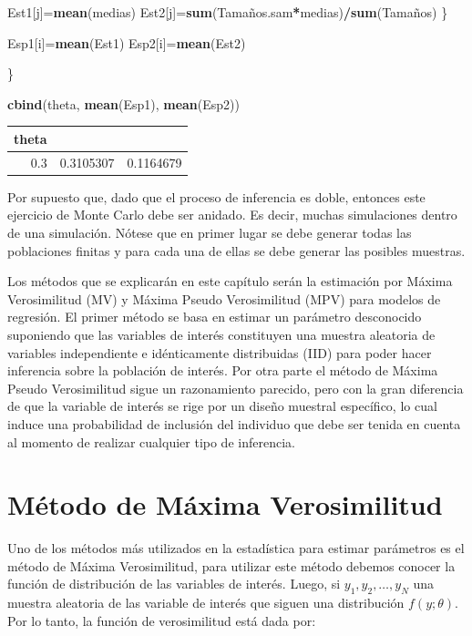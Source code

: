 \documentclass[
  spanish,
  12pt,
]{book}
\newenvironment{Shaded}{\begin{snugshade}}{\end{snugshade}}
\newcommand{\FunctionTok}[1]{\textcolor[rgb]{0.13,0.29,0.53}{\textbf{#1}}}
\newcommand{\NormalTok}[1]{#1}
\newcommand{\OtherTok}[1]{\textcolor[rgb]{0.56,0.35,0.01}{#1}}
\newcommand{\SpecialCharTok}[1]{\textcolor[rgb]{0.81,0.36,0.00}{\textbf{#1}}}
\begin{document}
\begin{Shaded}
\begin{Highlighting}[]
\NormalTok{Est1[j]}\OtherTok{=}\FunctionTok{mean}\NormalTok{(medias)}
\NormalTok{Est2[j]}\OtherTok{=}\FunctionTok{sum}\NormalTok{(Tamaños.sam}\SpecialCharTok{*}\NormalTok{medias)}\SpecialCharTok{/}\FunctionTok{sum}\NormalTok{(Tamaños)}
\NormalTok{\}}

\NormalTok{Esp1[i]}\OtherTok{=}\FunctionTok{mean}\NormalTok{(Est1)}
\NormalTok{Esp2[i]}\OtherTok{=}\FunctionTok{mean}\NormalTok{(Est2)}

\NormalTok{\}}

\FunctionTok{cbind}\NormalTok{(theta, }\FunctionTok{mean}\NormalTok{(Esp1), }\FunctionTok{mean}\NormalTok{(Esp2))}
\end{Highlighting}
\end{Shaded}

\begin{tabular}{r|r|r}
\hline
theta &  & \\
\hline
0.3 & 0.3105307 & 0.1164679\\
\hline
\end{tabular}

Por supuesto que, dado que el proceso de inferencia es doble, entonces este ejercicio de Monte Carlo debe ser anidado. Es decir, muchas simulaciones dentro de una simulación. Nótese que en primer lugar se debe generar todas las poblaciones finitas y para cada una de ellas se debe generar las posibles muestras.

Los métodos que se explicarán en este capítulo serán la estimación por Máxima Verosimilitud (MV) y Máxima Pseudo Verosimilitud (MPV) para modelos de regresión. El primer método se basa en estimar un parámetro desconocido suponiendo que las variables de interés constituyen una muestra aleatoria de variables independiente e idénticamente distribuidas (IID) para poder hacer inferencia sobre la población de interés. Por otra parte el método de Máxima Pseudo Verosimilitud sigue un razonamiento parecido, pero con la gran diferencia de que la variable de interés se rige por un diseño muestral específico, lo cual induce una probabilidad de inclusión del individuo que debe ser tenida en cuenta al momento de realizar cualquier tipo de inferencia.

\section{Método de Máxima Verosimilitud}\label{muxe9todo-de-muxe1xima-verosimilitud}

Uno de los métodos más utilizados en la estadística para estimar parámetros es el método de Máxima Verosimilitud, para utilizar este método debemos conocer la función de distribución de las variables de interés. Luego, si \(y_{1},y_{2},\ldots,y_{N}\) una muestra aleatoria de las variable de interés que siguen una distribución \(f(y;\theta)\). Por lo tanto, la función de verosimilitud está dada por:
\end{document}

